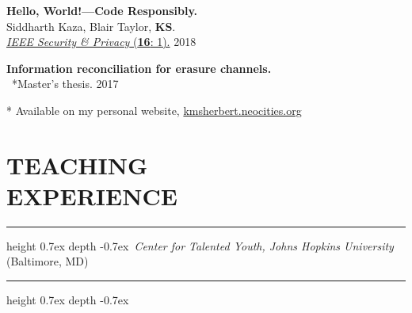 \documentclass[marginmode, 10pt]{res} %
\newcommand{\me}{\textbf{KS}}       %
\def\Vhrulefill{\leavevmode\leaders\hrule height 0.7ex depth \dimexpr0.4pt-0.7ex\hfill\kern0pt}         %
\begin{document}
\begin{resume}
\textbf{Hello, World!—Code Responsibly.} \\
    Siddharth Kaza, Blair Taylor, \me. \\
    \href{https://ieeexplore.ieee.org/document/8283486}{\textit{IEEE Security \& Privacy} (\textbf{16}: 1).} \hfill 2018

\textbf{Information reconciliation for erasure channels.} \\
    ~*Master's thesis. \hfill 2017

* Available on my personal website, \href{kmsherbert.neocities.org}{kmsherbert.neocities.org}


\pagebreak

\section{\small{TEACHING\\EXPERIENCE}}

\Vhrulefill ~\textit{Center for Talented Youth, Johns Hopkins University} (Baltimore, MD)~ \Vhrulefill


\end{resume}
\end{document}
